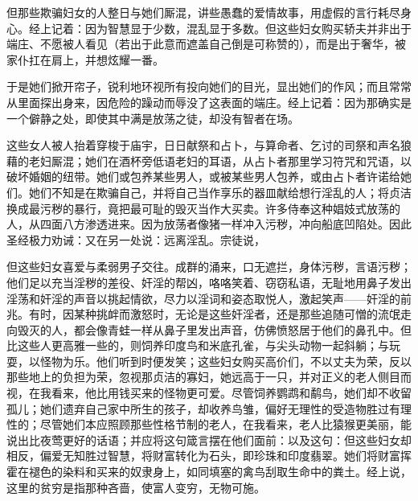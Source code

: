 但那些欺骗妇女的人整日与她们厮混，讲些愚蠢的爱情故事，用虚假的言行耗尽身心。经上记着：因为智慧显于少数，混乱显于多数。但这些妇女购买轿夫并非出于端庄、不愿被人看见（若出于此意而遮盖自己倒是可称赞的），而是出于奢华，被家仆扛在肩上，并想炫耀一番。\par

于是她们掀开帘子，锐利地环视所有投向她们的目光，显出她们的作风；而且常常从里面探出身来，因危险的躁动而辱没了这表面的端庄。经上记着：因为那确实是一个僻静之处，即使其中满是放荡之徒，却没有智者在场。\par

这些女人被人抬着穿梭于庙宇，日日献祭和占卜，与算命者、乞讨的司祭和声名狼藉的老妇厮混；她们在酒杯旁低语老妇的耳语，从占卜者那里学习符咒和咒语，以破坏婚姻的纽带。她们或包养某些男人，或被某些男人包养，或由占卜者许诺给她们。她们不知是在欺骗自己，并将自己当作享乐的器皿献给想行淫乱的人；将贞洁换成最污秽的暴行，竟把最可耻的毁灭当作大买卖。许多侍奉这种娼妓式放荡的人，从四面八方渗透进来。因为放荡者像猪一样冲入污秽，冲向船底凹陷处。因此圣经极力劝诫：又在另一处说：远离淫乱。宗徒说，\par

但这些妇女喜爱与柔弱男子交往。成群的涌来，口无遮拦，身体污秽，言语污秽；他们足以充当淫秽的差役、奸淫的帮凶，咯咯笑着、窃窃私语，无耻地用鼻子发出淫荡和奸淫的声音以挑起情欲，尽力以淫词和姿态取悦人，激起笑声——奸淫的前兆。有时，因某种挑衅而激怒时，无论是这些奸淫者，还是那些追随可憎的流氓走向毁灭的人，都会像青蛙一样从鼻子里发出声音，仿佛愤怒居于他们的鼻孔中。但比这些人更高雅一些的，则饲养印度鸟和米底孔雀，与尖头动物一起斜躺；与玩耍，以怪物为乐。他们听到时便发笑；这些妇女购买高价们，不以丈夫为荣，反以那些地上的负担为荣，忽视那贞洁的寡妇，她远高于一只，并对正义的老人侧目而视，在我看来，他比用钱买来的怪物更可爱。尽管饲养鹦鹉和鹬鸟，她们却不收留孤儿；她们遗弃自己家中所生的孩子，却收养鸟雏，偏好无理性的受造物胜过有理性的；尽管她们本应照顾那些性格节制的老人，在我看来，老人比猿猴更美丽，能说出比夜莺更好的话语；并应将这句箴言摆在他们面前：以及这句：但这些妇女却相反，偏爱无知胜过智慧，将财富转化为石头，即珍珠和印度翡翠。她们将财富挥霍在褪色的染料和买来的奴隶身上，如同填塞的禽鸟刮取生命中的粪土。经上说，这里的贫穷是指那种吝啬，使富人变穷，无物可施。\par

